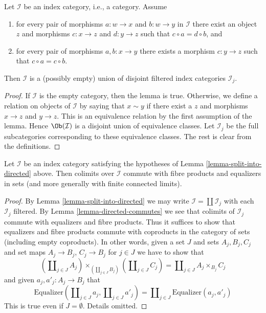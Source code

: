 \begin{lemma}
\label{lemma-split-into-directed}
Let $\mathcal{I}$ be an index category, i.e., a category.
Assume
\begin{enumerate}
\item for every pair of morphisms $a : w \to x$ and $b : w \to y$
in $\mathcal{I}$ there exist an object $z$ and morphisms $c : x \to z$
and $d : y \to z$ such that $c \circ a = d \circ b$, and
\item for every pair of morphisms $a, b : x \to y$ there exists
a morphism $c : y \to z$ such that $c \circ a = c \circ b$.
\end{enumerate}
Then $\mathcal{I}$ is a (possibly empty) union
of disjoint filtered index categories $\mathcal{I}_j$.
\end{lemma}

\begin{proof}
If $\mathcal{I}$ is the empty category, then the lemma is true.
Otherwise, we define a relation on objects of $\mathcal{I}$ by
saying that $x \sim y$ if there exist a $z$ and
morphisms $x \to z$ and $y \to z$. This is an equivalence
relation by the first assumption of the lemma. Hence $\Ob(\mathcal{I})$
is a disjoint union of equivalence classes. Let $\mathcal{I}_j$
be the full subcategories corresponding to these equivalence classes.
The rest is clear from the definitions.
\end{proof}

\begin{lemma}
\label{lemma-almost-directed-commutes-equalizers}
Let $\mathcal{I}$ be an index category satisfying the hypotheses of
Lemma \ref{lemma-split-into-directed} above. Then colimits over $\mathcal{I}$
commute with fibre products and equalizers in sets (and more generally
with finite connected limits).
\end{lemma}

\begin{proof}
By
Lemma \ref{lemma-split-into-directed}
we may write $\mathcal{I} = \coprod \mathcal{I}_j$ with each $\mathcal{I}_j$
filtered. By
Lemma \ref{lemma-directed-commutes}
we see that colimits of $\mathcal{I}_j$ commute with equalizers and
fibre products. Thus it suffices to show that equalizers and fibre products
commute with coproducts in the category of sets (including empty coproducts).
In other words, given a set $J$ and sets $A_j, B_j, C_j$ and set maps
$A_j \to B_j$, $C_j \to B_j$ for $j \in J$ we have to show that
$$
(\coprod\nolimits_{j \in J} A_j)
\times_{(\coprod\nolimits_{j \in J} B_j)}
(\coprod\nolimits_{j \in J} C_j)
=
\coprod\nolimits_{j \in J} A_j \times_{B_j} C_j
$$
and given $a_j, a'_j : A_j \to B_j$ that
$$
\text{Equalizer}(
\coprod\nolimits_{j \in J} a_j,
\coprod\nolimits_{j \in J} a'_j)
=
\coprod\nolimits_{j \in J}
\text{Equalizer}(a_j, a'_j)
$$
This is true even if $J = \emptyset$. Details omitted.
\end{proof}



